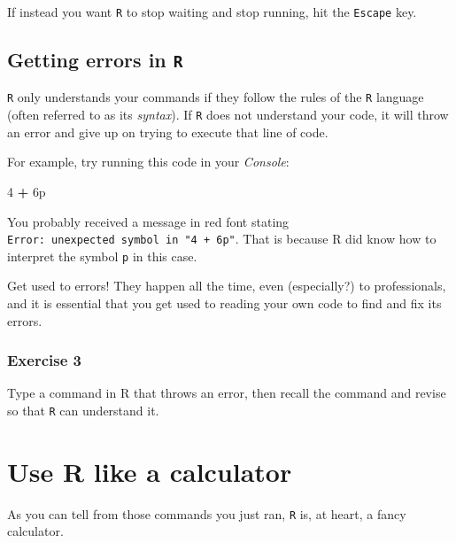 \documentclass[
]{book}
\newenvironment{Shaded}{\begin{snugshade}}{\end{snugshade}}
\newcommand{\DecValTok}[1]{\textcolor[rgb]{0.00,0.00,0.81}{#1}}
\newcommand{\NormalTok}[1]{#1}
\newcommand{\OperatorTok}[1]{\textcolor[rgb]{0.81,0.36,0.00}{\textbf{#1}}}
\newcommand{\StringTok}[1]{\textcolor[rgb]{0.31,0.60,0.02}{#1}}
\begin{document}
If instead you want \texttt{R} to stop waiting and stop running, hit the \texttt{Escape} key.

\hypertarget{getting-errors-in-r}{%
\subsection*{\texorpdfstring{Getting errors in \texttt{R}}{Getting errors in R}}\label{getting-errors-in-r}}

\texttt{R} only understands your commands if they follow the rules of the \texttt{R} language (often referred to as its \emph{syntax}). If \texttt{R} does not understand your code, it will throw an error and give up on trying to execute that line of code.

For example, try running this code in your \emph{Console}:

\begin{Shaded}
\begin{Highlighting}[]
\DecValTok{4} \OperatorTok{+}\StringTok{ }\NormalTok{6p}
\end{Highlighting}
\end{Shaded}

You probably received a message in red font stating \texttt{Error:\ unexpected\ symbol\ in\ "4\ +\ 6p"}. That is because R did know how to interpret the symbol \texttt{p} in this case.

Get used to errors! They happen all the time, even (especially?) to professionals, and it is essential that you get used to reading your own code to find and fix its errors.

\hypertarget{exercise-3}{%
\subsubsection*{Exercise 3}\label{exercise-3}}

Type a command in R that throws an error, then recall the command and revise so that \texttt{R} can understand it.

\hypertarget{use-r-like-a-calculator}{%
\section*{Use R like a calculator}\label{use-r-like-a-calculator}}

As you can tell from those commands you just ran, \texttt{R} is, at heart, a fancy calculator.
\end{document}
